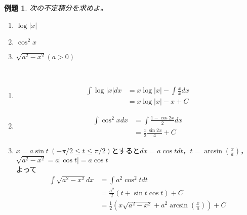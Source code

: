 \documentclass[dvipdfmx,a4j,10pt]{jsarticle}
\makeatletter
\theoremstyle{mystyle1}
\newtheorem{ex}[dfn]{例題}
\theoremstyle{mystyle2}
\newtheorem{ans}{解答}
\renewenvironment{ans}[1][解答]{\par
  \pushQED{\qed}%
  \normalfont
  \topsep6\p@\@plus6\p@ \trivlist
  \item[\hskip\labelsep{\bfseries\sffamily #1}]\ignorespaces
}{%
  \popQED\endtrivlist\@endpefalse
}
\makeatother
\begin{document}

\newpage

\begin{shaded}
\begin{ex}\label{ex9.2}
次の不定積分を求めよ。
\begin{enumerate}
\item $\log{|x|}$
\item $\cos^2 x$
\item $\sqrt{a^2-x^2}(a>0)$
\end{enumerate}
\end{ex}
\end{shaded}

\begin{ans}[解答\ref{ex9.2}]\
    \begin{enumerate}
        \item
        \[
        \begin{split}
        \int \log{|x|} dx
        &=x\log{|x|}-\int\frac{x}{x} dx\\
        &=x\log{|x|}-x+C
        \end{split}
        \]
        \item
        \[
        \begin{split}
        \int \cos^2 x dx
        &=\int \frac{1-\cos{2x}}{2} dx\\
        &=\frac{x}{2}\frac{\sin{2x}}{4}+C
        \end{split}
        \]
        \item
        $x=a\sin{t}\ (-\pi/2\leq t\leq \pi/2)$とすると$dx=a\cos{t}dt$，$\displaystyle t=\arcsin{\left(\frac{x}{a}\right)}$，$\sqrt{a^2-x^2}=a|\cos{t}|=a\cos{t}$\\よって
        \[
        \begin{split}
        \int\sqrt{a^2-x^2} dx&=\int a^2\cos^2t dt\\
        &=\frac{a^2}{2}(t+\sin{t}\cos{t})+C\\
        &=\frac{1}{2}\left(x\sqrt{a^2-x^2}+a^2\arcsin{\left(\frac{x}{a}\right)}\right)+C
        \end{split}
        \]
    \end{enumerate}
\end{ans}
\end{document}

